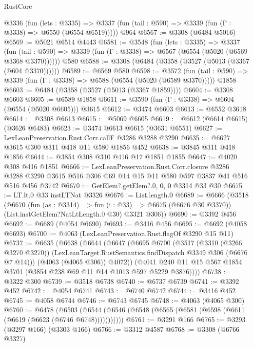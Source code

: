 \begin{lexlean}{RustCore}
\begin{coremodule}
    @3336
      (fun (lets : @3335) =>
      @3337 (fun (tail : @590) => @3339 (fun (Γ : @3338) => @6550 (@6554 @6519)))))
    @964
@6567 := @3308 (@6484 @5016)
@6569 := @5021 @6514 @4443
@6581 := @3548
    (fun (lets : @3335) =>
    @3337
      (fun (tail : @590) => @3339 (fun (Γ : @3338) => @6567 (@6554 (@5020 (@6569 @3368 @3370))))))
    @580
@6588 := @3308 (@6484 (@3358 (@3527 (@5013 (@3367 (@604 @3370))))))
@6589 := @6569 @580
@6598 := @3572
    (fun (tail : @590) => @3339 (fun (Γ : @3338) => @6588 (@6554 (@5020 (@6589 @3370)))))
    @1858
@6603 := @6484 (@3358 (@3527 (@5013 (@3367 @1859))))
@6604 := @3308 @6603
@6605 := @6589 @1858
@6611 := @3590 (fun (Γ : @3338) => @6604 (@6554 (@5020 @6605))) @3615
@6612 := @3474 @6603
@6613 := @6552 @3618
@6614 := @3308 @6613
@6615 := @5069 @6605
@6619 := @6612 (@6614 @6615) (@3626 @6483)
@6623 := @3474 @6613 @6615 (@3631 @6551)
@6627 := LexLeanPreservation.Rust.Corr.callF @3286 @3288 @3290
@6635 := @6627 @3615 @300 @311 @418 @11 @580 @1856 @452
@6638 := @3845 @311 @418 @1856
@6644 := @3854 @308 @310 @416 @17 @1851 @1855
@6647 := @4020 @308 @416 @1851
@6666 := LexLeanPreservation.Rust.Corr.closure
    @3286
    @3288
    @3290
    @3615
    @516
    @306
    @69
    @14
    @15
    @11
    @580
    @597
    @3837
    @41
    @516
    @516
    @456
    @3742
@6670 := GetElem?.getElem?.{0, 0, 0} @3314 @33 @30
@6675 := LT.lt.{0} @33 instLTNat @3326
@6676 := List.length.{0}
@6689 := @6666
    (@3518
      (@6670
        (fun (as : @3314) => fun (i : @33) => @6675 (@6676 @30 @3370))
        (List.instGetElem?NatLtLength.{0} @30)
        @3321
        @306))
@6690 := @3392 @456
@6692 := @6689 (@4054 @6690)
@6693 := @3416 @456
@6695 := @6692 (@4058 @6693)
@6700 := @4063 (LexLeanPreservation.Rust.flagOf @3290 @15 @11)
@6737 := @6635
    (@6638
      (@6644
        (@6647
          (@6695
            @6700
            (@3517
              (@3310 (@3266 @3270 @3270))
              (LexLeanTarget.RustSemantics.findDispatch @3349 @306 (@6676 @7 @14)))
            (@4063 (@4065 @306))
            @4072))
        (@4041 @240 @11 @15 @567 @1854 @3701 (@3854 @238 @69 @11 @14 @1013 @597 @5229 @3876))))
@6738 := @3322 @300
@6739 := @3518 @6738
@6740 := @6737 @6739
@6741 := @3392 @452
@6742 := @4054 @6741
@6743 := @6740 @6742
@6744 := @3416 @452
@6745 := @4058 @6744
@6746 := @6743 @6745
@6748 := @4063 (@4065 @300)
@6760 := @6478
    (@6503 (@6544 (@6546 (@6548 (@6565 (@6581 (@6598 (@6611 (@6619 (@6623 (@6746 @6748)))))))))))
@6761 := @3291 @166
@6765 := @3293 (@3297 @166) (@3303 @166)
@6766 := @3312 @4587
@6768 := @3308 (@6766 @3327)

\end{coremodule}
\end{lexlean}
